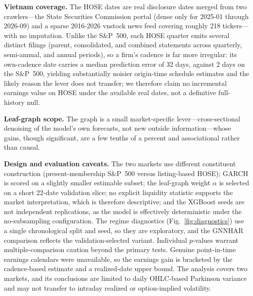 \documentclass[runningheads,a4paper]{llncs}
\begin{document}
\noindent\textbf{Vietnam coverage.} The HOSE dates are real disclosure dates merged from two crawlers---the
State Securities Commission portal (dense only for 2025-01 through 2026-09) and a sparse 2016-2026 vnstock
news feed covering roughly 218 tickers---with no imputation. Unlike the S\&P~500, each HOSE quarter emits
several distinct filings (parent, consolidated, and combined statements across quarterly, semi-annual, and
annual periods), so a firm's cadence is far more irregular: its own-cadence date carries a median
prediction error of 32 days, against 2 days on the S\&P~500, yielding substantially noisier origin-time schedule estimates and the
likely reason the lever does not transfer; we therefore claim no incremental earnings value on HOSE under
the available real dates, not a definitive full-history null.

\noindent\textbf{Leaf-graph scope.} The graph is a small market-specific lever---cross-sectional denoising
of the model's own forecasts, not new outside information---whose gains, though significant, are a few
tenths of a percent and associational rather than causal.

\noindent\textbf{Design and evaluation caveats.} The two markets use different constituent construction
(present-membership S\&P~500 versus listing-based HOSE); GARCH is scored on a slightly smaller estimable
subset; the leaf-graph weight $\alpha$ is selected on a short 22-date validation slice; no explicit
liquidity statistic supports the market interpretation, which is therefore descriptive; and the XGBoost
seeds are not independent replications, as the model is effectively deterministic under the no-subsampling
configuration. The regime diagnostics (Fig.~\ref{fig:diagnostics}) use a single chronological split and
seed, so they are exploratory, and the GNNHAR comparison reflects the validation-selected variant.
Individual $p$-values warrant multiple-comparison caution beyond the primary tests. Genuine point-in-time
earnings calendars were unavailable, so the earnings gain is bracketed by the cadence-based estimate and a
realized-date upper bound. The analysis covers two markets, and its conclusions are limited to daily
OHLC-based Parkinson variance and may not transfer to intraday realized or option-implied volatility.
\end{document}
